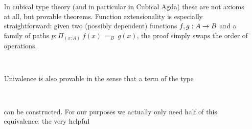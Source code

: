 In cubical type theory (and in particular in Cubical Agda) these are not axioms
at all, but provable theorems. Function extensionality is especially
straightforward: given two (possibly dependent) functions $f,g : A \rightarrow B$ and a
family of paths $p : \Pi_{(x:A)}~f(x)~=_B~g(x)$, the proof simply swaps the
order of operations.
\begin{code}%
\>[0]\AgdaSpace{}%
\AgdaSymbol{:}\AgdaSpace{}%
\AgdaSymbol{\{}\AgdaSpace{}%
\AgdaSpace{}%
\AgdaSymbol{:}\AgdaSpace{}%
\AgdaSymbol{\}}\AgdaSpace{}%
\AgdaSymbol{\{}\AgdaSpace{}%
\AgdaSpace{}%
\AgdaSymbol{:}\AgdaSpace{}%
\AgdaSpace{}%
\AgdaSpace{}%
\AgdaSymbol{\}}\AgdaSpace{}%
\AgdaSymbol{(}\AgdaSpace{}%
\AgdaSymbol{:}\AgdaSpace{}%
\AgdaSymbol{(}\AgdaSpace{}%
\AgdaSymbol{:}\AgdaSpace{}%
\AgdaSymbol{)}\AgdaSpace{}%
\AgdaSpace{}%
\AgdaSpace{}%
\AgdaSpace{}%
\AgdaSpace{}%
\AgdaSpace{}%
\AgdaSymbol{)}\AgdaSpace{}%
\AgdaSpace{}%
\AgdaSpace{}%
\AgdaSpace{}%
\<%
\\
\>[0]\AgdaSpace{}%
\AgdaSpace{}%
\AgdaSpace{}%
\AgdaSpace{}%
\AgdaSymbol{=}\AgdaSpace{}%
\AgdaSpace{}%
\AgdaSpace{}%
\<%
\end{code}

Univalence is also provable in the sense that a term of the type
\begin{code}[hide]%
\>[0]\<%
\\
\>[0][@{}l@{\AgdaIndent{0}}]%
\>[2]\AgdaSpace{}%
\AgdaSymbol{:}\<%
\end{code}
\begin{code}%
\>[2][@{}l@{\AgdaIndent{1}}]%
\>[4]\AgdaSymbol{\{}\AgdaSpace{}%
\AgdaSpace{}%
\AgdaSymbol{:}\AgdaSpace{}%
\AgdaSymbol{\}}\AgdaSpace{}%
\AgdaSpace{}%
\AgdaSymbol{(}\AgdaSpace{}%
\AgdaSpace{}%
\AgdaSymbol{)}\AgdaSpace{}%
\AgdaSpace{}%
\AgdaSymbol{(}\AgdaSpace{}%
\AgdaSpace{}%
\AgdaSymbol{)}\<%
\end{code}
can be constructed. For our purposes we actually only need half of this
equivalence: the very helpful
\begin{code}%
%
\>[2]\AgdaSpace{}%
\AgdaSymbol{:}\AgdaSpace{}%
\AgdaSymbol{\{}\AgdaSpace{}%
\AgdaSpace{}%
\AgdaSymbol{:}\AgdaSpace{}%
\AgdaSymbol{\}}\AgdaSpace{}%
\AgdaSpace{}%
\AgdaSpace{}%
\AgdaSpace{}%
\AgdaSpace{}%
\AgdaSpace{}%
\AgdaSpace{}%
\AgdaSpace{}%
\<%
\end{code}

